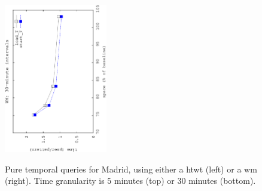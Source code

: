 \begin{figure}[ht]
\begin{center}
\begin{center}
				{\includegraphics[angle=-90,width=0.4\textwidth]{figures_synt/madrid_t30mwm.eps}}
			\end{center}
		\end{center}
		\caption{Pure temporal queries for Madrid, using either a \acrshort{htwt} (left) or a \acrshort{wm} (right). 
			Time granularity is $5$ minutes (top) or $30$ minutes (bottom).}
		\label{fig:ctr:exp:queries:temp:madrid}
	\end{figure}





